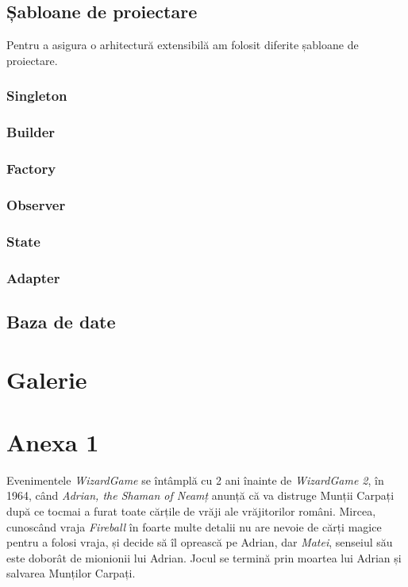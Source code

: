 \documentclass{article}
\begin{document}
    \inputminted[linenos, breaklines]{json}{example-level.json}

    \subsection{Șabloane de proiectare}

    Pentru a asigura o arhitectură extensibilă am folosit diferite șabloane de proiectare.

    \subsubsection{Singleton}
    \subsubsection{Builder}
    \subsubsection{Factory}
    \subsubsection{Observer}
    \subsubsection{State}
    \subsubsection{Adapter}

    \subsection{Baza de date}

    \section{Galerie}

    \section*{Anexa 1}
    \label{sec:anexa1}
    Evenimentele \emph{WizardGame} se întâmplă cu 2 ani înainte de \emph{WizardGame 2}, în 1964,
    când \emph{Adrian, the Shaman of Neamț} anunță că va distruge Munții Carpați după ce tocmai
    a furat toate cărțile de vrăji ale vrăjitorilor români. Mircea, cunoscând vraja \emph{Fireball}
    în foarte multe detalii nu are nevoie de cărți magice pentru a folosi vraja, și decide să îl
    oprească pe Adrian, dar \emph{Matei}, senseiul său este doborât de mionionii lui Adrian.
    Jocul se termină prin moartea lui Adrian și salvarea Munților Carpați.
\end{document}
